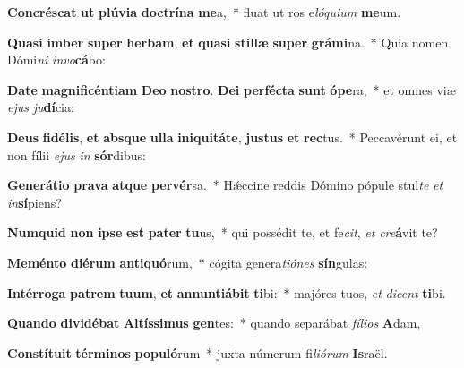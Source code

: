 \item \textbf{Con}\textbf{crés}\textbf{cat} \textbf{ut} \textbf{plú}\textbf{vi}\textbf{a} \textbf{doc}\textbf{trí}\textbf{na} \textbf{me}a,~* fluat ut ros e\textit{ló}\textit{qui}\textit{um} \textbf{me}um.
\item \textbf{Qua}\textbf{si} \textbf{im}\textbf{ber} \textbf{su}\textbf{per} \textbf{her}\textbf{bam}, \textbf{et} \textbf{qua}\textbf{si} \textbf{stil}\textbf{læ} \textbf{su}\textbf{per} \textbf{grá}\textbf{mi}na.~* Quia nomen Dómi\textit{ni} \textit{in}\textit{vo}\textbf{cá}bo:
\item \textbf{Da}\textbf{te} \textbf{ma}\textbf{gni}\textbf{fi}\textbf{cén}\textbf{ti}\textbf{am} \textbf{De}\textbf{o} \textbf{nos}\textbf{tro}. \textbf{De}\textbf{i} \textbf{per}\textbf{féc}\textbf{ta} \textbf{sunt} \textbf{ó}\textbf{pe}ra,~* et omnes viæ \textit{e}\textit{jus} \textit{ju}\textbf{dí}cia:
\item \textbf{De}\textbf{us} \textbf{fi}\textbf{dé}\textbf{lis}, \textbf{et} \textbf{abs}\textbf{que} \textbf{ul}\textbf{la} \textbf{in}\textbf{i}\textbf{qui}\textbf{tá}\textbf{te}, \textbf{jus}\textbf{tus} \textbf{et} \textbf{rec}tus.~* Peccavérunt ei, et non fílii \textit{e}\textit{jus} \textit{in} \textbf{sór}dibus:
\item \textbf{Ge}\textbf{ne}\textbf{rá}\textbf{ti}\textbf{o} \textbf{pra}\textbf{va} \textbf{at}\textbf{que} \textbf{per}\textbf{vér}sa.~* Hǽccine reddis Dómino pópule stul\textit{te} \textit{et} \textit{in}\textbf{sí}piens?
\item \textbf{Num}\textbf{quid} \textbf{non} \textbf{ip}\textbf{se} \textbf{est} \textbf{pa}\textbf{ter} \textbf{tu}us,~* qui possédit te, et fe\textit{cit}, \textit{et} \textit{cre}\textbf{á}vit te?
\item \textbf{Me}\textbf{mén}\textbf{to} \textbf{di}\textbf{é}\textbf{rum} \textbf{an}\textbf{ti}\textbf{quó}rum,~* cógita genera\textit{ti}\textit{ó}\textit{nes} \textbf{sín}gulas:
\item \textbf{In}\textbf{tér}\textbf{ro}\textbf{ga} \textbf{pa}\textbf{trem} \textbf{tu}\textbf{um}, \textbf{et} \textbf{an}\textbf{nun}\textbf{ti}\textbf{á}\textbf{bit} \textbf{ti}bi:~* majóres tuos, \textit{et} \textit{di}\textit{cent} \textbf{ti}bi.
\item \textbf{Quan}\textbf{do} \textbf{di}\textbf{vi}\textbf{dé}\textbf{bat} \textbf{Al}\textbf{tís}\textbf{si}\textbf{mus} \textbf{gen}tes:~* quando separábat \textit{fí}\textit{li}\textit{os} \textbf{A}dam,
\item \textbf{Con}\textbf{stí}\textbf{tu}\textbf{it} \textbf{tér}\textbf{mi}\textbf{nos} \textbf{po}\textbf{pu}\textbf{ló}rum~* juxta númerum fi\textit{li}\textit{ó}\textit{rum} \textbf{Is}raël.

